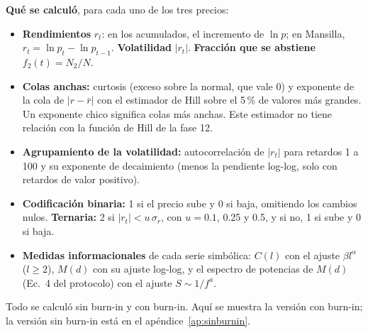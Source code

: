 \documentclass[11pt,letterpaper]{article}
\begin{document}
\textbf{Qué se calculó}, para cada uno de los tres precios:
\begin{itemize}
\item \textbf{Rendimientos} $r_t$: en los acumulados, el incremento de $\ln p$; en Mansilla, $r_t=\ln p_t-\ln p_{t-1}$. \textbf{Volatilidad} $|r_t|$. \textbf{Fracción que se abstiene} $f_2(t)=N_2/N$.
\item \textbf{Colas anchas:} curtosis (exceso sobre la normal, que vale 0) y exponente de la cola de $|r-\bar r|$ con el estimador de Hill sobre el 5\,\% de valores más grandes. Un exponente chico significa colas más anchas. Este estimador no tiene relación con la función de Hill de la fase 12.
\item \textbf{Agrupamiento de la volatilidad:} autocorrelación de $|r_t|$ para retardos 1 a 100 y su exponente de decaimiento (menos la pendiente log-log, solo con retardos de valor positivo).
\item \textbf{Codificación binaria:} 1 si el precio sube y 0 si baja, omitiendo los cambios nulos. \textbf{Ternaria:} 2 si $|r_t|<u\,\sigma_r$, con $u=0.1$, 0.25 y 0.5, y si no, 1 si sube y 0 si baja.
\item \textbf{Medidas informacionales} de cada serie simbólica: $C(l)$ con el ajuste $\beta l^\alpha$ ($l\ge 2$), $M(d)$ con su ajuste log-log, y el espectro de potencias de $M(d)$ (Ec.~4 del protocolo) con el ajuste $S\sim 1/f^{a}$.
\end{itemize}
Todo se calculó sin burn-in y con burn-in. Aquí se muestra la versión con burn-in; la versión sin burn-in está en el apéndice~\ref{ap:sinburnin}.
\end{document}
